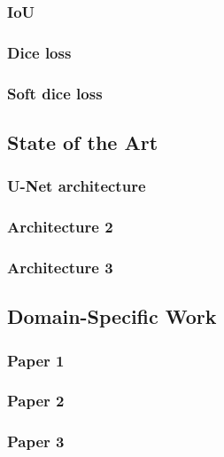   \subsubsection*{IoU}
  

  \subsubsection*{Dice loss}
  

  \subsubsection*{Soft dice loss}
  

\subsection{State of the Art}
\label{sec:cnn-architectures}
  \subsubsection{U-Net architecture}
  \subsubsection{Architecture 2}
  \subsubsection{Architecture 3}

\subsection{Domain-Specific Work}
\label{sec:remote-sensing-research}
  \subsubsection{Paper 1}
  \subsubsection{Paper 2}
  \subsubsection{Paper 3}
